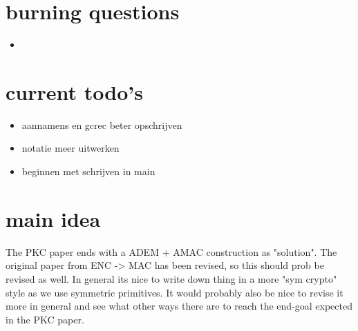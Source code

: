 \documentclass{article}
\begin{document}
\section{burning questions}
\begin{itemize}
   \item 
\end{itemize}

\newpage
\section{current todo's}
\begin{itemize}
    \item aannamens en gcrec beter opschrijven
    \item notatie meer uitwerken
    \item beginnen met schrijven in main
\end{itemize}

\newpage
\section{main idea}
The PKC paper ends with a ADEM + AMAC construction as "solution". The original paper from ENC -> MAC has been revised, so this should prob be revised as well. In general its nice to write down thing in a more "sym crypto" style as we use symmetric primitives. It would probably also be nice to revise it more in general and see what other ways there are to reach the end-goal expected in the PKC paper.
\end{document}
